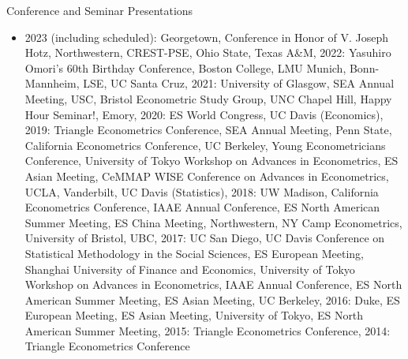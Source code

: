 \documentclass{article}
\begin{document}
\bigskip\noindent Conference and Seminar Presentations
\begin{itemize}
\item[] 
2023 (including scheduled): 
Georgetown,
Conference in Honor of V. Joseph Hotz,
Northwestern, 
CREST-PSE,
Ohio State, 
Texas A\&M, 
2022: 
Yasuhiro Omori's 60th Birthday Conference,
Boston College, 
LMU Munich,
Bonn-Mannheim, 
LSE,
UC Santa Cruz,
2021: 
University of Glasgow, 
SEA Annual Meeting, 
USC,
Bristol Econometric Study Group,
UNC Chapel Hill, 
Happy Hour Seminar!, 
Emory,
2020: 
ES World Congress, 
UC Davis (Economics),
2019: 
Triangle Econometrics Conference, 
SEA Annual Meeting, 
Penn State, 
California Econometrics Conference, 
UC Berkeley,
Young Econometricians Conference,
University of Tokyo Workshop on Advances in Econometrics, 
ES Asian Meeting,
CeMMAP WISE Conference on Advances in Econometrics,
UCLA,
Vanderbilt,
UC Davis (Statistics),
2018: 
UW Madison,
California Econometrics Conference,
IAAE Annual Conference,
ES North American Summer Meeting,
ES China Meeting,
Northwestern,
NY Camp Econometrics,
University of Bristol,
UBC,
2017: 
UC San Diego,
UC Davis Conference on Statistical Methodology in the Social Sciences,
ES European Meeting,
Shanghai University of Finance and Economics,
University of Tokyo Workshop on Advances in Econometrics,
IAAE Annual Conference,
ES North American Summer Meeting,
ES Asian Meeting,
UC Berkeley,
2016: 
Duke,
ES European Meeting,
ES Asian Meeting,
University of Tokyo,
ES North American Summer Meeting,
2015: 
Triangle Econometrics Conference,
2014: 
Triangle Econometrics Conference
\end{itemize}
\end{document}

